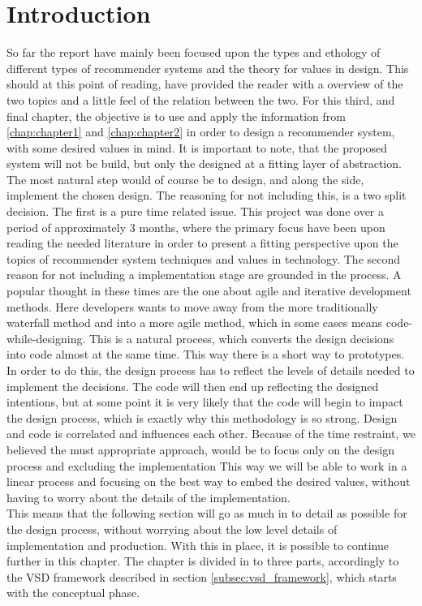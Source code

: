 \section{Introduction}


So far the report have mainly been focused upon the types and ethology of different types of recommender systems and the theory for values in design. This should at this point of reading, have provided the reader with a overview of the two topics and a little feel of the relation between the two. For this third, and final chapter, the objective is to use and apply the information from \ref{chap:chapter1} and \ref{chap:chapter2} in order to design a recommender system, with some desired values in mind. It is important to note, that the proposed system will not be build, but only the designed at a fitting layer of abstraction. The most natural step would of course be to design, and along the side, implement the chosen design. The reasoning for not including this, is a two split decision. The first is a pure time related issue. This project was done over a period of approximately 3 months, where the primary focus have been upon reading the needed literature in order to present a fitting perspective upon the topics of recommender system techniques and values in technology. The second reason for not including a implementation stage are grounded in the process. A popular thought in these times are the one about agile and iterative development methods. Here developers wants to move away from the more traditionally waterfall method and into a more agile method, which in some cases means code-while-designing. This is a natural process, which converts the design decisions into code almost at the same time. This way there is a short way to prototypes. In order to do this, the design process has to reflect the levels of details needed to implement the decisions. The code will then end up reflecting the designed intentions, but at some point it is very likely that the code will begin to impact the design process, which is exactly why this methodology is so strong. Design and code is correlated and influences each other. Because of the time restraint, we believed the must appropriate approach, would be to focus only on the design process and excluding the implementation This way we will be able to work in a linear process and focusing on the best way to embed the desired values, without having to worry about the details of the implementation.\\
This means that the following section will go as much in to detail as possible for the design process, without worrying about the low level details of implementation and production. 
With this in place, it is possible to continue further in this chapter. The chapter is divided in to three parts, accordingly to the VSD framework described in section \ref{subsec:vsd_framework}, which starts with the conceptual phase.
